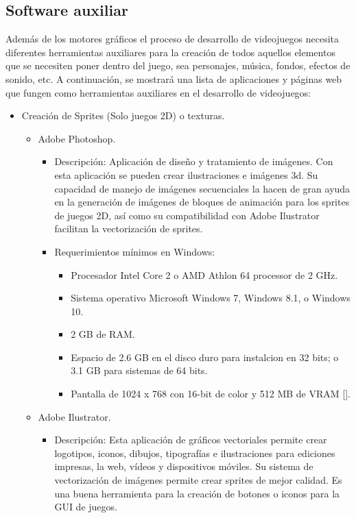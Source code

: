 	\subsection{Software auxiliar}
	Además de los motores gráficos el proceso de desarrollo de videojuegos necesita diferentes herramientas auxiliares para la creación de todos aquellos elementos que se necesiten poner dentro del juego, sea personajes, música, fondos, efectos de sonido, etc. A continuación, se mostrará una lista de aplicaciones y páginas web que fungen como herramientas auxiliares en el desarrollo de videojuegos:
	
	\begin{itemize}
		\item Creación de Sprites (Solo juegos 2D) o texturas.
			\begin{itemize}
				\item Adobe Photoshop.
					\begin{itemize}
						\item Descripción: Aplicación de diseño y tratamiento de imágenes. Con esta aplicación se pueden crear ilustraciones e imágenes 3d. Su capacidad de manejo de imágenes secuenciales la hacen de gran ayuda en la generación de imágenes de bloques de animación para los sprites de juegos 2D, así como su compatibilidad con Adobe Ilustrator facilitan la vectorización de sprites.
						\item Requerimientos mínimos en Windows:
						\begin{itemize}
							\item Procesador Intel Core 2 o AMD Athlon 64 processor de 2 GHz.
							\item Sistema operativo Microsoft Windows 7, Windows 8.1, o Windows 10.
							\item 2 GB de RAM.
							\item Espacio de 2.6 GB en el disco duro para instalcion en 32 bits; o 3.1 GB para sistemas de 64 bits.
							\item Pantalla de 1024 x 768 con 16-bit de color y 512 MB de VRAM [].
						\end{itemize}
					\end{itemize}
				\item Adobe Ilustrator.
					\begin{itemize}
						\item Descripción: Esta aplicación de gráficos vectoriales permite crear logotipos, iconos, dibujos, tipografías e ilustraciones para ediciones impresas, la web, vídeos y dispositivos móviles. Su sistema de vectorización de imágenes permite crear sprites de mejor calidad.  Es una buena herramienta para la creación de botones o iconos para la GUI de juegos.

\end{itemize}
\end{itemize}
\end{itemize}
